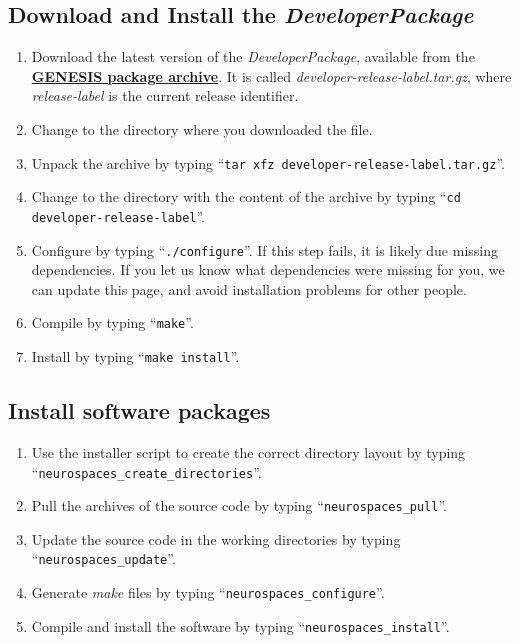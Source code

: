 \documentclass[12pt]{article}
\begin{document}
\subsection*{Download and Install the {\it DeveloperPackage}}

\begin{enumerate}
   \item Download the latest version of the {\it DeveloperPackage}, available from the \href{http://repo-genesis3.cbi.utsa.edu/src/}{\bf GENESIS package archive}. It is called {\it developer-release-label.tar.gz}, where {\it release-label} is the current release identifier.
   \item Change to the directory where you downloaded the file.
   \item Unpack the archive by typing ``{\tt tar xfz developer-release-label.tar.gz}''.
   \item Change to the directory with the content of the archive by typing ``{\tt cd developer-release-label}''.
   \item Configure by typing ``{\tt ./configure}''.  If this step fails, it is likely due missing dependencies.  If you let us know what dependencies were missing for you, we can update this page, and avoid installation problems for other people.
   \item Compile by typing ``{\tt make}''.
   \item Install by typing ``{\tt make install}''. 
\end{enumerate}

\subsection*{Install software packages}

\begin{enumerate}
   \item Use the installer script to create the correct directory layout by typing ``{\tt neurospaces\_create\_directories}''.
   \item Pull the archives of the source code by typing ``{\tt neurospaces\_pull}''.
   \item Update the source code in the working directories by typing ``{\tt neurospaces\_update}''.
   \item Generate {\it make} files by typing ``{\tt neurospaces\_configure}''.
   \item Compile and install the software by typing ``{\tt neurospaces\_install}''.
\end{enumerate}
\end{document}
